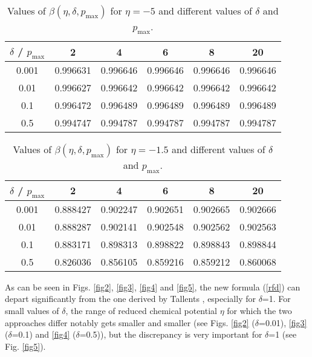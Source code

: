 \documentclass[a4paper,10pt]{article}
\begin{document}
\begin{table}[ht]
\begin{center}
\begin{tabular}{|c|c|c|c|c|c|}\hline
 $\delta$ / $p_{\mathrm{max}}$ & 2 & 4 & 6 & 8 & 20\\ \hline
0.001 & 0.996631 & 0.996646 & 0.996646 & 0.996646 & 0.996646 \\ 
0.01 & 0.996627 & 0.996642 & 0.996642 & 0.996642 & 0.996642 \\
0.1 & 0.996472 & 0.996489 & 0.996489 & 0.996489 & 0.996489 \\
0.5 & 0.994747 & 0.994787 & 0.994787 & 0.994787 & 0.994787 \\
\hline
\end{tabular}
\end{center}
\caption{Values of $\beta\left(\eta,\delta,p_{\mathrm{max}}\right)$ for $\eta=-5$ and different values of $\delta$ and $p_{\mathrm{max}}$.}\label{tab2}
\end{table}

\begin{table}[ht]
\begin{center}
\begin{tabular}{|c|c|c|c|c|c|}\hline
 $\delta$ / $p_{\mathrm{max}}$ & 2 & 4 & 6 & 8 & 20\\ \hline
0.001 & 0.888427 & 0.902247 & 0.902651 & 0.902665 & 0.902666 \\ 
0.01 & 0.888287 & 0.902141 & 0.902548 & 0.902562 & 0.902563 \\
0.1 & 0.883171 & 0.898313 & 0.898822 & 0.898843 & 0.898844 \\
0.5 & 0.826036 & 0.856105 & 0.859216 & 0.859212 & 0.860068 \\
\hline
\end{tabular}
\end{center}
\caption{Values of $\beta\left(\eta,\delta,p_{\mathrm{max}}\right)$ for $\eta=-1.5$ and different values of $\delta$ and $p_{\mathrm{max}}$.}\label{tab3}
\end{table}

As can be seen in Figs. \ref{fig2}, \ref{fig3}, \ref{fig4} and \ref{fig5}, the new formula (\ref{rfd}) can depart significantly from the one derived by Tallents \cite{TALLENTS16}, especially for $\delta$=1. For small values of $\delta$, the range of reduced chemical potential $\eta$ for which the two approaches differ notably gets smaller and smaller (see Figs. \ref{fig2} ($\delta$=0.01), \ref{fig3} ($\delta$=0.1) and \ref{fig4} ($\delta$=0.5)), but the discrepancy is very important for $\delta$=1 (see Fig. \ref{fig5}).
\end{document}
